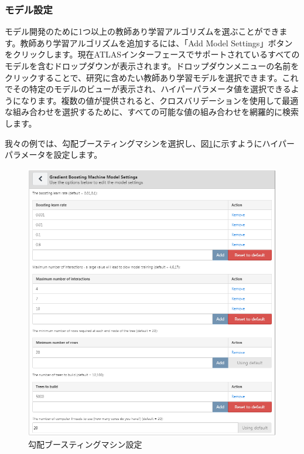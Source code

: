 \documentclass[
  11pt]{book}
\theoremstyle{definition}
\theoremstyle{definition}
\theoremstyle{definition}
\theoremstyle{definition}
\theoremstyle{remark}
\begin{document}
\subsubsection*{モデル設定}\label{ux30e2ux30c7ux30ebux8a2dux5b9a}

モデル開発のために1つ以上の教師あり学習アルゴリズムを選ぶことができます。教師あり学習アルゴリズムを追加するには、「Add Model Settings」ボタンをクリックします。現在ATLASインターフェースでサポートされているすべてのモデルを含むドロップダウンが表示されます。ドロップダウンメニューの名前をクリックすることで、研究に含めたい教師あり学習モデルを選択できます。これでその特定のモデルのビューが表示され、ハイパーパラメータ値を選択できるようになります。複数の値が提供されると、クロスバリデーションを使用して最適な組み合わせを選択するために、すべての可能な値の組み合わせを網羅的に検索します。

我々の例では、勾配ブースティングマシンを選択し、図\ref{fig:gbmSettings}に示すようにハイパーパラメータを設定します。

\begin{figure}

{\centering \includegraphics[width=1\linewidth]{images/PatientLevelPrediction/gbmSettings} 

}

\caption{勾配ブースティングマシン設定}\label{fig:gbmSettings}
\end{figure}
\end{document}

